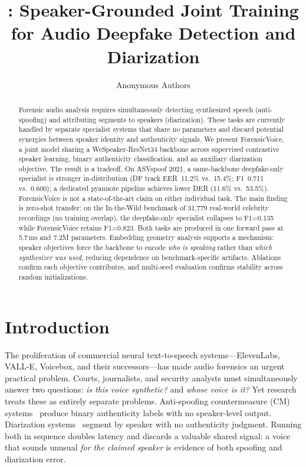\documentclass{article}
\title{\fv{}: Speaker-Grounded Joint Training for Audio Deepfake Detection and Diarization}
\author{Anonymous Authors}
\newcommand{\fv}{ForensicVoice}
\begin{document}
\maketitle

\begin{abstract}
Forensic audio analysis requires simultaneously detecting synthesized speech
(anti-spoofing) and attributing segments to speakers (diarization). These tasks
are currently handled by separate specialist systems that share no parameters and
discard potential synergies between speaker identity and authenticity signals.
We present \fv{}, a joint model sharing a WeSpeaker-ResNet34 backbone across
supervised contrastive speaker learning, binary authenticity classification, and
an auxiliary diarization objective. The result is a tradeoff. On ASVspoof 2021,
a same-backbone deepfake-only specialist is stronger in-distribution (DF track
EER~11.2\% vs.\ 15.4\%; F1~0.711 vs.\ 0.600); a dedicated pyannote pipeline
achieves lower DER (11.6\% vs.\ 53.5\%). \fv{} is not a state-of-the-art claim
on either individual task. The main finding is zero-shot transfer: on the
In-the-Wild benchmark of 31{,}779 real-world celebrity recordings (no training
overlap), the deepfake-only specialist collapses to F1=0.135 while \fv{} retains
F1=0.823. Both tasks are produced in one forward pass at 5.7\,ms and 7.2M
parameters. Embedding geometry analysis supports a mechanism: speaker objectives
force the backbone to encode \emph{who is speaking} rather than
\emph{which synthesizer was used}, reducing dependence on benchmark-specific
artifacts. Ablations confirm each objective contributes, and multi-seed
evaluation confirms stability across random initializations.
\end{abstract}

\section{Introduction}

The proliferation of commercial neural text-to-speech systems---ElevenLabs,
VALL-E, Voicebox, and their successors---has made audio forensics an urgent
practical problem. Courts, journalists, and security analysts must simultaneously
answer two questions: \emph{is this voice synthetic?} and \emph{whose voice is
it?} Yet research treats these as entirely separate problems. Anti-spoofing
countermeasure (CM) systems~\citep{jung2022aasist,tak2022w2vaasist} produce
binary authenticity labels with no speaker-level output. Diarization
systems~\citep{bredin2020pyannote,plaquet2023powerset} segment by speaker with
no authenticity judgment. Running both in sequence doubles latency and discards
a valuable shared signal: a voice that sounds unusual \emph{for the claimed
speaker} is evidence of both spoofing and diarization error.
\end{document}

